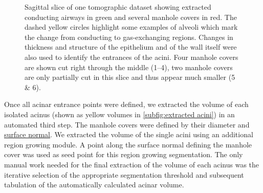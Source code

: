 \documentclass[a4paper,DIV=calc,abstract,english]{scrartcl}
\newlength\imagescale		%
\begin{document}
\begin{figure}
%
	\caption{Sagittal slice of one tomographic dataset showing extracted conducting airways in green and several manhole covers in red.
		The dashed yellow circles highlight some examples of alveoli which mark the change from conducting to gas-exchanging regions.
		Changes in thickness and structure of the epithelium and of the wall itself were also used to identify the entrances of the acini.
		Four manhole covers are shown cut right through the middle (\numrange{1}{4}), two manhole covers are only partially cut in this slice and thus appear much smaller (5 \& 6).}
	\label{fig:ManholeCoverExplanation}
\end{figure}

Once all acinar entrance points were defined, we extracted the volume of each isolated acinus (shown as yellow volumes in \autoref{subfig:extracted acini}) in an automated third step.
The manhole covers were defined by their diameter and \href{https://secure.wikimedia.org/wikipedia/en/w/index.php?title=Surface_normal&oldid=411684319}{surface normal}.
We extracted the volume of the single acini using an additional region growing module.
A point along the surface normal defining the manhole cover was used as seed point for this region growing segmentation.
The only manual work needed for the final extraction of the volume of each acinus was the iterative selection of the appropriate segmentation threshold and subsequent tabulation of the automatically calculated acinar volume.
\end{document}
